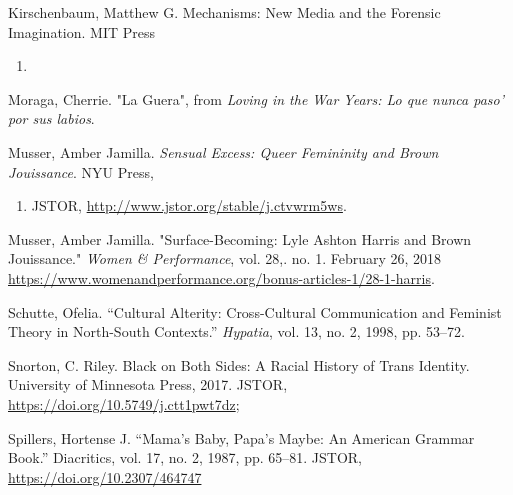 \documentclass[11pt]{article}
\begin{document}
Kirschenbaum, Matthew G. Mechanisms: New Media and the Forensic Imagination. MIT Press 
\begin{enumerate}
\item 
\end{enumerate}

Moraga, Cherrie. "La Guera", from \emph{Loving in the War Years: Lo que
nunca paso' por sus labios}.

Musser, Amber Jamilla. \emph{Sensual Excess: Queer Femininity and Brown
Jouissance}. NYU Press,
\begin{enumerate}
\item JSTOR, \url{http://www.jstor.org/stable/j.ctvwrm5ws}.
\end{enumerate}

Musser, Amber Jamilla. "Surface-Becoming: Lyle Ashton Harris and Brown
  Jouissance." \emph{Women \& Performance}, vol. 28,. no. 1. February 26, 2018
  \url{https://www.womenandperformance.org/bonus-articles-1/28-1-harris}. 

Schutte, Ofelia. “Cultural Alterity: Cross-Cultural Communication and
Feminist Theory in North-South Contexts.” \emph{Hypatia}, vol. 13, no. 2,
1998, pp. 53–72.

Snorton, C. Riley. Black on Both Sides: A Racial History of Trans Identity. University of 
Minnesota Press, 2017. JSTOR, \url{https://doi.org/10.5749/j.ctt1pwt7dz};

Spillers, Hortense J. “Mama’s Baby, Papa’s Maybe: An American Grammar Book.” Diacritics, 
vol. 17, no. 2, 1987, pp. 65–81. JSTOR, \url{https://doi.org/10.2307/464747}
\end{document}
